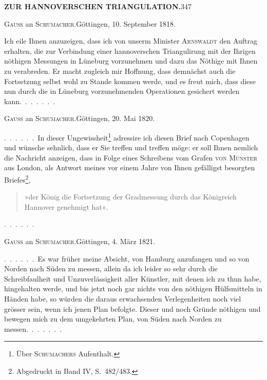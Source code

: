 \noindent\textbf{ZUR HANNOVERSCHEN TRIANGULATION.}\hfill347
\begin{center}\textsc{Gauss} an \textsc{Schumacher}.\quad Göttingen, 10. September 1818.\end{center}

Ich eile Ihnen anzuzeigen, dass ich von unserm Minister \textsc{Arnswaldt} den
Auftrag erhalten, die zur Verbindung einer hannoverschen Triangulirung mit
der Ihrigen nöthigen Messungen in Lüneburg vorzunehmen und dazu das
Nöthige mit Ihnen zu verabreden. Er macht zugleich mir Hoffnung, dass
demnächst auch die Fortsetzung selbst wohl zu Stande kommen werde, und
es freut mich, dass diese nun durch die in Lüneburg vorzunehmenden Operationen
gesichert werden kann.\ .\ .\ .\ .\ .\ .

\begin{center}\textsc{Gauss} an \textsc{Schumacher}.\quad Göttingen, 20. Mai 1820.\end{center}
\begingroup
\makeatletter
\renewcommand{\@makefnmark}{\hbox{\normalfont[\textsuperscript{*})]}}
\long{}
\makeatother
\par\noindent\hspace*{\parindent}.\ .\ .\ .\ .\ .\ In dieser Ungewissheit\footnote{Über \textsc{Schumachers} Aufenthalt.} adressire ich diesen Brief nach Copenhagen
und wünsche sehnlich, dass er Sie treffen und  treffen möge: er
soll Ihnen nemlich die Nachricht anzeigen, dass in Folge eines Schreibens
vom Grafen \textsc{von Münster} aus London, als Antwort meines vor einem Jahre
\makeatletter
\renewcommand{\@makefnmark}{\hbox{\normalfont[\textsuperscript{**})]}}
\long\def\@makefntext#1{\parindent1.5em\noindent[\textsuperscript{**})\ #1]}
\makeatother
von Ihnen gefälligst besorgten Briefes\footnote{Abgedruckt in Band IV, S.~482/483.},
\begin{quote}
»der König die Fortsetzung der Gradmessung durch das Königreich
Hannover genehmigt hat«.
\end{quote}
\par\medskip
.\ .\ .\ .\ .\ .
\endgroup

\begin{center}\textsc{Gauss} an \textsc{Schumacher}.\quad Göttingen, 4. März 1821.\end{center}

.\ .\ .\ .\ .\ .\ Es war früher meine Absicht, von Hamburg anzufangen und so
von Norden nach Süden zu messen, allein da ich leider so sehr durch die
Schreibfaulheit und Unzuverlässigkeit aller Künstler, mit denen ich zu thun
habe, hingehalten werde, und bis jetzt noch gar nichts von den nöthigen
Hülfsmitteln in Händen habe, so würden die daraus erwachsenden Verlegenheiten
noch viel grösser sein, wenn ich jenen Plan befolgte. Dieser und noch
 Gründe nöthigen und bewegen mich zu
dem umgekehrten Plan, von Süden nach Norden zu messen.\ .\ .\ .\ .\ .\ .
\par
\makeatletter
\insert{}
\makeatother

